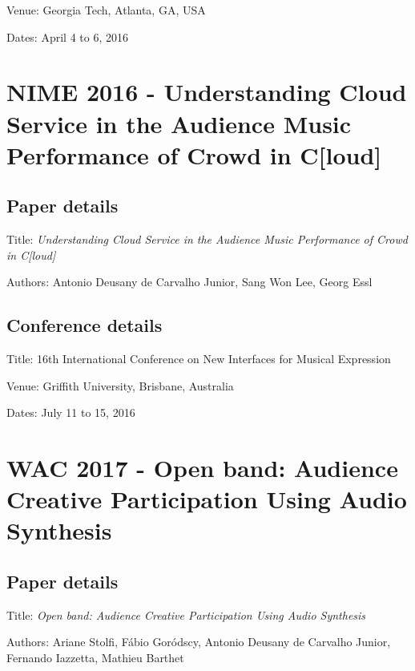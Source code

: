 Venue: Georgia Tech, Atlanta, GA, USA

Dates: April 4 to 6, 2016




\section{NIME 2016 - Understanding Cloud Service in the Audience Music Performance of Crowd in C[loud]}
\label{ape:papernime2016}

\subsection*{Paper details}

Title: \textit{Understanding Cloud Service in the Audience Music Performance of Crowd in C[loud]}

Authors: Antonio Deusany de Carvalho Junior, Sang Won Lee, Georg Essl

\subsection*{Conference details}

Title: 16th International Conference on New Interfaces for Musical Expression

Venue: Griffith University, Brisbane, Australia

Dates: July 11 to 15, 2016



\section{WAC 2017 - Open band: Audience Creative Participation Using Audio Synthesis}
\label{ape:paperwac2017}

\subsection*{Paper details}

Title: \textit{Open band: Audience Creative Participation Using Audio Synthesis}

Authors: Ariane Stolfi, Fábio Goródscy, Antonio Deusany de Carvalho Junior, Fernando Iazzetta, Mathieu Barthet

